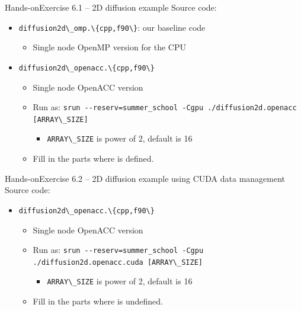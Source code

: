 \documentclass[12pt,aspectratio=169]{beamer}
\newcommand\shinline[2][]{\lstinline[style=shstyle,basicstyle=\ttfamily,#1]!#2!}
\begin{document}
\begin{frame}[fragile]{Hands-on}{Exercise 6.1 -- 2D diffusion example}
  Source code:
  \begin{itemize}
  \item \shinline{diffusion2d\_omp.\{cpp,f90\}}: our baseline code
    \begin{itemize}
    \item Single node OpenMP version for the CPU
    \end{itemize}
  \item \shinline{diffusion2d\_openacc.\{cpp,f90\}}
    \begin{itemize}
    \item Single node OpenACC version
      \item Run as: \shinline{srun --reserv=summer_school -Cgpu ./diffusion2d.openacc [ARRAY\_SIZE]}
        \begin{itemize}
        \item \shinline{ARRAY\_SIZE} is power of 2, default is 16
        \end{itemize}
      \item Fill in the parts where  is defined.
    \end{itemize}
  \end{itemize}
\end{frame}

\begin{frame}[fragile]{Hands-on}{Exercise 6.2 -- 2D diffusion example using CUDA data management}
  Source code:
  \begin{itemize}
  \item \shinline{diffusion2d\_openacc.\{cpp,f90\}}
    \begin{itemize}
    \item Single node OpenACC version
      \item Run as: \shinline{srun --reserv=summer_school -Cgpu ./diffusion2d.openacc.cuda [ARRAY\_SIZE]}
        \begin{itemize}
        \item \shinline{ARRAY\_SIZE} is power of 2, default is 16
        \end{itemize}
      \item Fill in the parts where  is undefined.
    \end{itemize}
  \end{itemize}
\end{frame}
\end{document}
